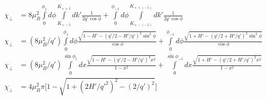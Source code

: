 \documentclass[prb,showpacs,amssymb,amsmath,twocolumn]{revtex4-1}
\begin{document}
\begin{widetext}
    \begin{align*}
 \chi_\perp&=8\mu_B^2 \int\limits_0^{\phi_1} d\phi \int\limits_{K_{+-1}}^{K_{++1}}dk'  \frac{ 1}{ 2q'\cos\phi}+\int\limits_0^{\phi_{-1}} d\phi \int\limits_{K_{+-(-1)}}^{K_{++(-1)}} dk'  \frac{ 1}{ 2q'\cos\phi}  \\
  \chi_\perp&=(8\mu_B^2/q') \int\limits_0^{\phi_1} d\phi   \frac{ \sqrt{1-H'-(q'/2-H'/q')^2\sin^2\phi}}{ \cos\phi} 
 + \int\limits_0^{\phi_{-1}} d\phi \frac{  \sqrt{1+H'-(q'/2+H'/q')^2\sin^2\phi}}{ \cos\phi}  \\
   \chi_\perp&=(8\mu_B^2/q') \int\limits_0^{\sin\phi_1} dx \frac{ \sqrt{1-H'-(q'/2-H'/q')^2x^2}}{ 1-x^2} 
 +\int\limits_0^{\sin\phi_{-1}} dx \frac{  \sqrt{1+H'-(q'/2+H'/q')^2 x^2}}{ 1-x^2}  \\
    \chi_\perp&=4\mu_B^2\pi \bigg[1-\sqrt{1+(2H'/q'^2)^2-(2/q')^2}\bigg] \\
 \end{align*}
\end{widetext}







\end{document}
